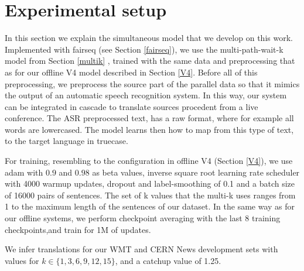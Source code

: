 \documentclass[11pt,english,listoffigures,listoftables]{tfgetsinf}
\begin{document}
\section{Experimental setup}
In this section we explain the simultaneous model that we develop on this work. Implemented with fairseq (see Section \ref{fairseq}), we use the multi-path-wait-k model from Section \ref{multik} \cite{DBLP:journals/corr/abs-2005-08595}, trained with the same data and preprocessing that as for our offline V4 model described in Section \ref{V4}. Before all of this preprocessing, we preprocess the source part of the parallel data so that it mimics the output of an automatic speech recognition system. In this way, our system can be integrated in cascade to translate sources procedent from a live conference. The ASR preprocessed text, has a raw format, where for example all words are lowercased. The model learns then how to map from this type of text, to the target language in truecase. 

For training, resembling to the configuration in offline V4 (Section \ref{V4}), we use adam with $0.9$ and $0.98$ as beta values, inverse square root learning rate scheduler with 4000 warmup updates, dropout and label-smoothing of 0.1 and a batch size of 16000 pairs of sentences. The set of k values that the multi-k uses ranges from 1 to the maximum length of the sentences of our dataset. In the same way as for our offline systems, we perform checkpoint averaging with the last 8 training checkpoints,and train for 1M of updates.

We infer translations for our WMT and CERN News development sets with values for $k \in \{1,3,6,9,12,15\}$, and a catchup value of 1.25. 
\end{document}
